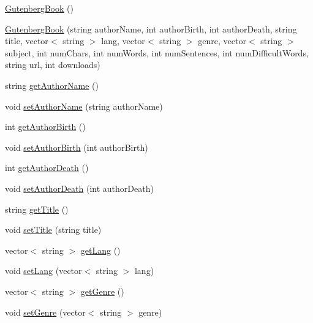 \begin{DoxyCompactItemize}
\item 
\mbox{\hyperlink{classbridges_1_1_gutenberg_book_a289c167dd11eed17cce39a59931f246c}{Gutenberg\+Book}} ()
\item 
\mbox{\hyperlink{classbridges_1_1_gutenberg_book_ab792768f0f2567835e90659f163f4438}{Gutenberg\+Book}} (string author\+Name, int author\+Birth, int author\+Death, string title, vector$<$ string $>$ lang, vector$<$ string $>$ genre, vector$<$ string $>$ subject, int num\+Chars, int num\+Words, int num\+Sentences, int num\+Difficult\+Words, string url, int downloads)
\item 
string \mbox{\hyperlink{classbridges_1_1_gutenberg_book_aa323f15acc05fd74bb59cd3c182ca686}{get\+Author\+Name}} ()
\item 
void \mbox{\hyperlink{classbridges_1_1_gutenberg_book_ab7b3a1d3398b75100b8d3fb7936b3ac9}{set\+Author\+Name}} (string author\+Name)
\item 
int \mbox{\hyperlink{classbridges_1_1_gutenberg_book_a86f4ea70ec32fd1cce772910b9dcc9a6}{get\+Author\+Birth}} ()
\item 
void \mbox{\hyperlink{classbridges_1_1_gutenberg_book_a33ac2e6063319064006fa72b6fcfb0dc}{set\+Author\+Birth}} (int author\+Birth)
\item 
int \mbox{\hyperlink{classbridges_1_1_gutenberg_book_a82ae9b4815b25f8e7b337f143f1cf828}{get\+Author\+Death}} ()
\item 
void \mbox{\hyperlink{classbridges_1_1_gutenberg_book_acf1e81a3b635fb939bc6af772a61fd3c}{set\+Author\+Death}} (int author\+Death)
\item 
string \mbox{\hyperlink{classbridges_1_1_gutenberg_book_a1ef4a40396485a78480f99ca3b490db0}{get\+Title}} ()
\item 
void \mbox{\hyperlink{classbridges_1_1_gutenberg_book_a5038252948e5f173dad4926c0970c5d3}{set\+Title}} (string title)
\item 
vector$<$ string $>$ \mbox{\hyperlink{classbridges_1_1_gutenberg_book_ac2eabdf4c650bc3720dcf5b030a59d0d}{get\+Lang}} ()
\item 
void \mbox{\hyperlink{classbridges_1_1_gutenberg_book_ab8cf27c1e496eb34d1e74e8343b4a466}{set\+Lang}} (vector$<$ string $>$ lang)
\item 
vector$<$ string $>$ \mbox{\hyperlink{classbridges_1_1_gutenberg_book_a7caa2af2fdd0af98e95ed4fad74efdd7}{get\+Genre}} ()
\item 
void \mbox{\hyperlink{classbridges_1_1_gutenberg_book_a2b81b6cf785ea9dfef0a1b1e15331b38}{set\+Genre}} (vector$<$ string $>$ genre)

\end{DoxyCompactItemize}

